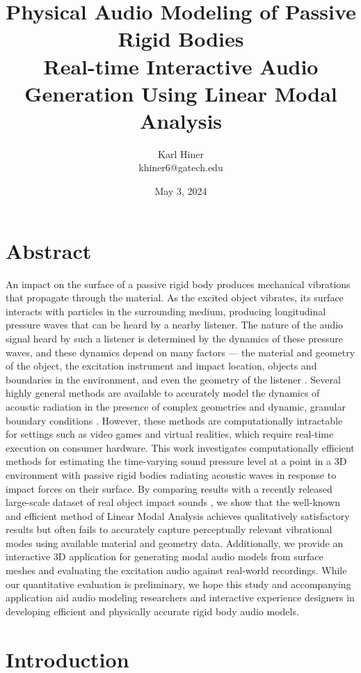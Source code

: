 \documentclass[12pt]{article}
\title{
  Physical Audio Modeling of Passive Rigid Bodies\\
  \large Real-time Interactive Audio Generation Using Linear Modal Analysis
}
\author{Karl Hiner\\khiner6@gatech.edu}
\date{May 3, 2024}
\begin{document}
\maketitle

\section{Abstract}

An impact on the surface of a passive rigid body produces mechanical vibrations that propagate through the material.
As the excited object vibrates, its surface interacts with particles in the surrounding medium, producing longitudinal pressure waves that can be heard by a nearby listener.
The nature of the audio signal heard by such a listener is determined by the dynamics of these pressure waves, and these dynamics depend on many factors --- the material and geometry of the object, the excitation instrument and impact location, objects and boundaries in the environment, and even the geometry of the listener \cite{starch_perimetry_1908}.
Several highly general methods are available to accurately model the dynamics of acoustic radiation in the presence of complex geometries \cite{wang_wbss_2018} and dynamic, granular boundary conditions \cite{schneider_fdtd_2010}.
However, these methods are computationally intractable for settings such as video games and virtual realities, which require real-time execution on consumer hardware.
This work investigates computationally efficient methods for estimating the time-varying sound pressure level at a point in a 3D environment with passive rigid bodies radiating acoustic waves in response to impact forces on their surface.
By comparing results with a recently released large-scale dataset of real object impact sounds \cite{clarke_realimpact_2023}, we show that the well-known and efficient method of Linear Modal Analysis achieves qualitatively satisfactory results but often fails to accurately capture perceptually relevant vibrational modes using available material and geometry data.
Additionally, we provide an interactive 3D application for generating modal audio models from surface meshes and evaluating the excitation audio against real-world recordings.
While our quantitative evaluation is preliminary, we hope this study and accompanying application aid audio modeling researchers and interactive experience designers in developing efficient and physically accurate rigid body audio models.

\section{Introduction}
\end{document}
